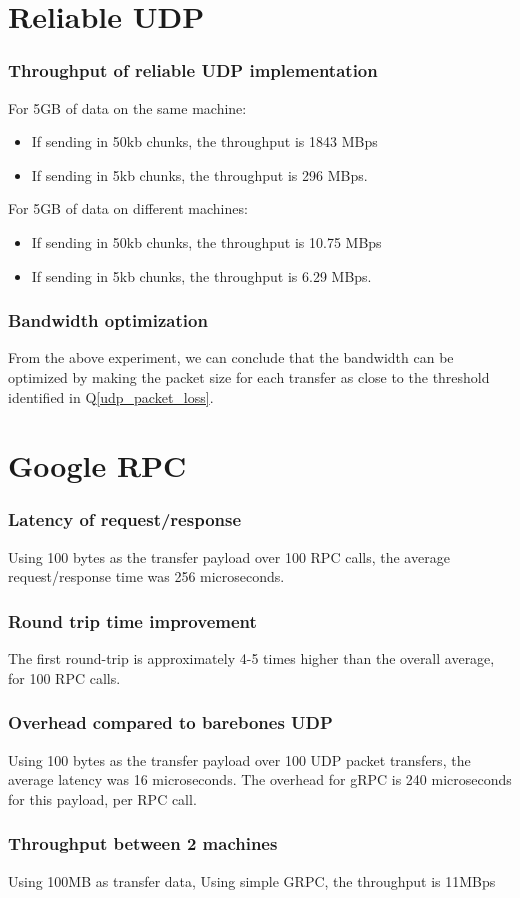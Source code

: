 \documentclass[a4paper]{article}
\begin{document}
\part{Reliable UDP}

\section{Throughput of reliable UDP implementation}
For 5GB of data on the same machine:
\begin{itemize}
	\item If sending in 50kb chunks, the throughput is 1843 MBps
	\item If sending in 5kb chunks, the throughput is 296 MBps.
\end{itemize}
For 5GB of data on different machines:
\begin{itemize}
	\item If sending in 50kb chunks, the throughput is 10.75 MBps
	\item If sending in 5kb chunks, the throughput is 6.29 MBps.
\end{itemize}

\section{Bandwidth optimization}
From the above experiment, we can conclude that the bandwidth can be optimized by making the packet size for each transfer as close to the threshold identified in Q\ref{udp_packet_loss}.

\part{Google RPC}

\section{Latency of request/response}
Using 100 bytes as the transfer payload over 100 RPC calls, the average request/response time was 256 microseconds.

\section{Round trip time improvement}
The first round-trip is approximately 4-5 times higher than the overall average, for 100 RPC calls.

\section{Overhead compared to barebones UDP}
Using 100 bytes as the transfer payload over 100 UDP packet transfers, the average latency was 16 microseconds. 
The overhead for gRPC is 240 microseconds for this payload, per RPC call.

\section{Throughput between 2 machines}
Using 100MB as transfer data,
Using simple GRPC, the throughput is 11MBps
\end{document}
